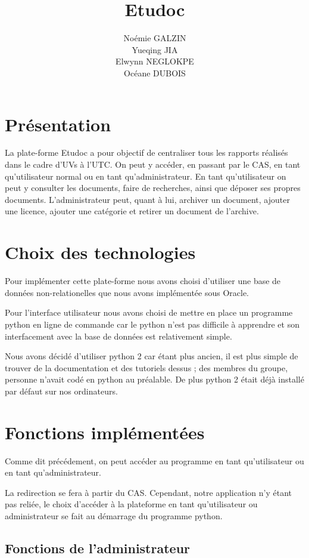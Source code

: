\documentclass[11pt]{report}
\title{\textbf{Etudoc}}
\author{Noémie GALZIN \\
		Yueqing JIA \\
		Elwynn NEGLOKPE\\
		Océane DUBOIS}
\date{}
\begin{document}
\maketitle
\newpage
\section{Présentation}
La plate-forme Etudoc a pour objectif de centraliser tous les rapports réalisés dans le cadre d'UVs à l'UTC. On peut y accéder, en passant par le CAS, en tant qu'utilisateur normal ou en tant qu'administrateur. 
En tant qu'utilisateur on peut y consulter les documents, faire de recherches, ainsi que déposer ses propres documents. 
L'administrateur peut, quant à lui, archiver un document, ajouter une licence, ajouter une catégorie et retirer un document de l'archive.

\section{Choix des technologies}
Pour implémenter cette plate-forme nous avons choisi d'utiliser une base de données non-relationelles que nous avons implémentée sous Oracle. 

Pour l'interface utilisateur nous avons choisi de mettre en place un programme python en ligne de commande car le python n'est pas difficile à apprendre et son interfacement avec la base de données est relativement simple.

Nous avons décidé d'utiliser python 2 car étant plus ancien, il est plus simple de trouver de la documentation et des tutoriels dessus ; des membres du groupe, personne n'avait codé en python au préalable. De plus python 2 était déjà installé par défaut sur nos ordinateurs.

\section{Fonctions implémentées}

Comme dit précédement, on peut accéder au programme en tant qu'utilisateur ou en tant qu'administrateur.

La redirection se fera à partir du CAS. Cependant, notre application n'y étant pas reliée, le choix d'accéder à la plateforme en tant qu'utilisateur ou administrateur se fait au démarrage du programme python.

\subsection{Fonctions de l'administrateur}
\end{document}
